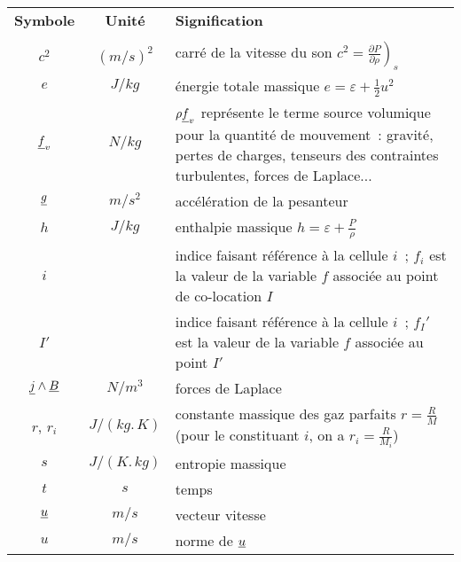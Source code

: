 \clearpage

\begin{table}[htp]
\begin{tabular}{ccp{}}

{\bf Symbole} & {\bf Unité} & {\bf Signification}\\

\phantom{$C_v$, ${C_v}_i$} & \phantom{$\lbrack f\rbrack.\,kg/(m^3.\,s)$} & \\

$c^2$                 & $(m/s)^2$         & carré de la vitesse du son
                $c^2 = \left.\frac{\partial P}{\partial \rho}\right)_s$\\
$e$                 & $J/kg$         & énergie totale massique
                                        $e = \varepsilon + \frac{1}{2}u^2$\\
$\underline{f}_v$         & $N/kg$         & $\rho\underline{f}_v$ représente le terme
                                        source volumique pour la quantité
                                        de mouvement~: gravité, pertes
                                        de charges, tenseurs des contraintes
                                        turbulentes, forces de Laplace...\\
$\underline{g}$         & $m/s^2$         & accélération de la pesanteur\\
$h$                 & $J/kg$         & enthalpie massique
                                        $h=\varepsilon + \frac{P}{\rho}$\\
$i$                 &                  & indice faisant référence à la
                                        cellule $i$~; $f_i$ est la valeur
                                        de la variable $f$ associée
                                        au point de co-location $I$\\
$I'$                 &                  & indice faisant référence à la
                                        cellule $i$~; $f_I'$ est la valeur
                                        de la variable $f$ associée
                                        au point $I'$\\
$\underline{j}\wedge\underline{B}$
                & $N/m^3$         & forces de Laplace\\
$r$, $r_i$         & $J/(kg.\,K)$         & constante massique des gaz parfaits
                                        $r = \frac{R}{M}$
                                        (pour le constituant $i$, on a $r_i=\frac{R}{M_i}$)\\
$s$                 & $J/(K.\,kg)$         & entropie massique\\
$t$                 & $s$                 & temps\\
$\underline{u}$         & $m/s$         & vecteur vitesse\\
$u$                 & $m/s$         & norme de $\underline{u}$\\

\end{tabular}
\end{table}


